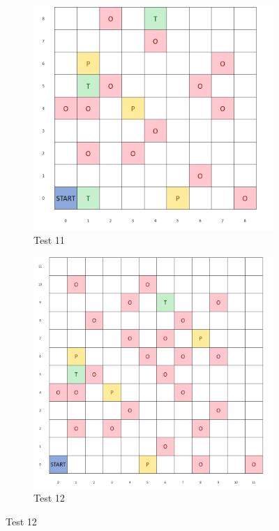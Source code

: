 \documentclass{article}
\begin{document}
\begin{appendices}
\begin{figure}[H]
   	 \centering
     \begin{subfigure}[b]{0.45\textwidth}
         \centering
         \includegraphics[width=\textwidth]{images/test11.png}
         \caption{Test 11}
         \label{fig:test111}
     \end{subfigure}
     \hfill
     \begin{subfigure}[b]{0.45\textwidth}
         \centering
         \includegraphics[width=\textwidth]{images/test12.png}
         \caption{Test 12}
         \label{fig:test112}
     \end{subfigure}
\end{figure}


\end{appendices}
\end{document}
